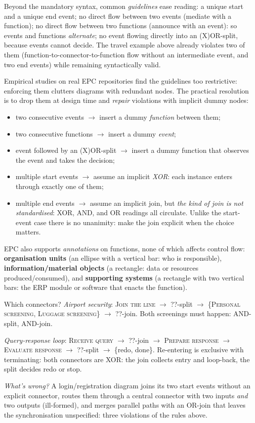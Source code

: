Beyond the mandatory syntax, common \emph{guidelines} ease reading: a unique start and a unique end event; no direct flow between two events (mediate with a function); no direct flow between two functions (announce with an event): so events and functions \emph{alternate}; no event flowing directly into an (X)OR-split, because events cannot decide. The travel example above already violates two of them (function-to-connector-to-function flow without an intermediate event, and two end events) while remaining syntactically valid.

Empirical studies on real EPC repositories find the guidelines too restrictive: enforcing them clutters diagrams with redundant nodes. The practical resolution is to drop them at design time and \emph{repair} violations with implicit dummy nodes:
\begin{itemize}
  \item two consecutive events $\to$ insert a dummy \emph{function} between them;
  \item two consecutive functions $\to$ insert a dummy \emph{event};
  \item event followed by an (X)OR-split $\to$ insert a dummy function that observes the event and takes the decision;
  \item multiple start events $\to$ assume an implicit \emph{XOR}: each instance enters through exactly one of them;
  \item multiple end events $\to$ assume an implicit join, but \emph{the kind of join is not standardised}: XOR, AND, and OR readings all circulate. Unlike the start-event case there is no unanimity: make the join explicit when the choice matters.
\end{itemize}

EPC also supports \emph{annotations} on functions, none of which affects control flow: \textbf{organisation units} (an ellipse with a vertical bar: who is responsible), \textbf{information/material objects} (a rectangle: data or resources produced/consumed), and \textbf{supporting systems} (a rectangle with two vertical bars: the ERP module or software that enacts the function).

\begin{examplebox}{Which connectors?}
\emph{Airport security}: \textsc{Join the line} $\to$ ??-split $\to$ \{\textsc{Personal screening}, \textsc{Luggage screening}\} $\to$ ??-join. Both screenings must happen: AND-split, AND-join.
\par\smallskip
\emph{Query-response loop}: \textsc{Receive query} $\to$ ??-join $\to$ \textsc{Prepare response} $\to$ \textsc{Evaluate response} $\to$ ??-split $\to$ \{redo, done\}. Re-entering is exclusive with terminating: both connectors are XOR: the join collects entry and loop-back, the split decides redo or stop.
\par\smallskip
\emph{What's wrong?} A login/registration diagram joins its two start events without an explicit connector, routes them through a central connector with two inputs \emph{and} two outputs (ill-formed), and merges parallel paths with an OR-join that leaves the synchronisation unspecified: three violations of the rules above.
\end{examplebox}

